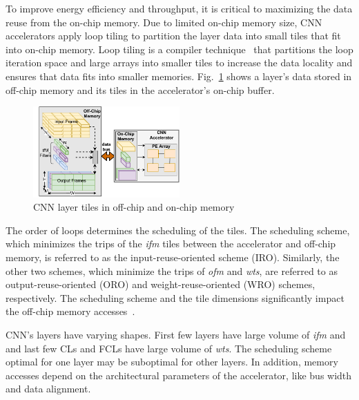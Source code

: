 \documentclass[a4paper,10pt]{article}
\begin{document}
To improve energy efficiency and throughput, it is critical to maximizing the data reuse from the on-chip memory. Due to limited on-chip memory size, CNN accelerators apply loop tiling to partition the layer data into small tiles that fit into on-chip memory. Loop tiling is a compiler  technique~\cite{aho2006compilers} that partitions the loop iteration space and large arrays into smaller tiles to increase the data locality and ensures that data fits into smaller memories. 
Fig.~\ref{fig:partitioningDataUsingTiling} shows a layer's data stored in off-chip memory and its tiles in the accelerator's on-chip buffer.
\begin{figure}[!htb]
	\centering
    \captionsetup{font=sf}	
	\includegraphics[width=0.5\textwidth]{images/AboutTheCNNTiles.pdf}
	\caption{CNN layer tiles in off-chip and on-chip memory}
	\label{fig:partitioningDataUsingTiling}
\end{figure}
 The order of loops determines the scheduling of the tiles. The scheduling scheme, which minimizes the trips of the \textit{ifm} tiles between the accelerator and off-chip memory, is referred to as the input-reuse-oriented scheme (IRO). Similarly, the other two schemes, which minimize the trips of \textit{ofm} and \textit{wts}, are referred to as output-reuse-oriented (ORO) and weight-reuse-oriented (WRO) schemes, respectively. The scheduling scheme and the tile dimensions significantly impact the off-chip memory accesses~\cite{zhang2015optimizing, Li2018SmartShuttleOO}. 
 
CNN's layers have varying shapes. First few layers have large volume of \textit{ifm} and  and last few CLs and FCLs have large volume of \textit{wts}. The scheduling scheme optimal for one layer may be suboptimal for other layers. In addition, memory accesses depend on the architectural parameters of the accelerator, like bus width and data alignment. 
\end{document}
